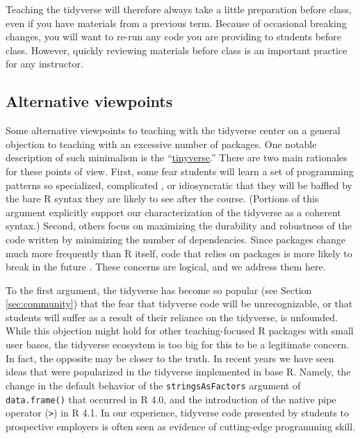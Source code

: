 \documentclass[12pt]{article}
\begin{document}
Teaching the tidyverse will therefore always take a little preparation
before class, even if you have materials from a previous term. Because
of occasional breaking changes, you will want to re-run any code you are
providing to students before class. However, quickly reviewing materials
before class is an important practice for any instructor.

\hypertarget{alternative-viewpoints}{%
\subsection{Alternative viewpoints}\label{alternative-viewpoints}}

Some alternative viewpoints to teaching with the tidyverse center on a
general objection to teaching with an excessive number of packages. One
notable description of such minimalism is the
``\href{https://www.tinyverse.org}{tinyverse}.'' There are two main
rationales for these points of view. First, some fear students will
learn a set of programming patterns so specialized, complicated
\citep{leek2016why}, or idiosyncratic \citep{matloff2020tidyverse} that
they will be baffled by the bare R syntax they are likely to see after
the course. (Portions of this argument explicitly support our
characterization of the tidyverse as a coherent syntax.) Second, others
focus on maximizing the durability and robustness of the code written by
minimizing the number of dependencies. Since packages change much more
frequently than R itself, code that relies on packages is more likely to
break in the future \citep{tinyverse2018}. These concerns are logical,
and we address them here.

To the first argument, the tidyverse has become so popular (see Section
\ref{sec:community}) that the fear that tidyverse code will be
unrecognizable, or that students will suffer as a result of their
reliance on the tidyverse, is unfounded. While this objection might hold
for other teaching-focused R packages with small user bases, the
tidyverse ecosystem is too big for this to be a legitimate concern. In
fact, the opposite may be closer to the truth. In recent years we have
seen ideas that were popularized in the tidyverse implemented in base R.
Namely, the change in the default behavior of the
\texttt{stringsAsFactors} argument of \texttt{data.frame()} that
occurred in R 4.0, and the introduction of the native pipe operator
(\texttt{\textbar{}\textgreater{}}) in R 4.1. In our experience,
tidyverse code presented by students to prospective employers is often
seen as evidence of cutting-edge programming skill.
\end{document}
